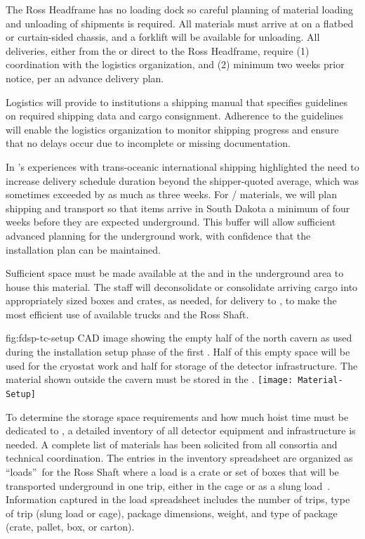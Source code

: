 The Ross Headframe has no loading dock so careful planning of material loading and unloading of shipments is required. 
All materials must arrive at  on a flatbed or curtain-sided chassis, and a forklift will be available for unloading. 
All deliveries, either from the  or direct to the Ross Headframe, require (1) coordination with the logistics organization, and (2) minimum two weeks prior notice, per an advance delivery plan.  
 
Logistics will provide to  institutions a shipping manual that  
specifies guidelines on required shipping data and cargo consignment. Adherence to the guidelines will enable the logistics organization to monitor shipping progress and ensure that no delays occur due to incomplete or missing documentation. 


In 's experiences with trans-oceanic international shipping highlighted the need to increase delivery schedule duration beyond the shipper-quoted average, which was sometimes exceeded by as much as three weeks. For / materials, we will plan shipping and transport so that items arrive in South Dakota a minimum of four weeks before they are expected underground. This buffer will allow sufficient advanced planning for the underground work, with confidence that the installation plan can be maintained.


Sufficient space must be made available at the  and in the underground area  to house this material.
The  staff will deconsolidate or consolidate arriving cargo into appropriately sized boxes and crates, as needed, for delivery to , to make the most efficient use of available trucks and the Ross Shaft. 

\begin{dunefigure}{fig:fdsp-tc-setup}
  {CAD image showing the empty half of the north cavern as used during the installation setup phase of the first .  Half of this empty space will be used for the cryostat work and half for storage of the detector infrastructure. The material shown outside the cavern must be stored in the .}
\texttt{[image: Material-Setup]}
\end{dunefigure}


To determine the storage space requirements and how much hoist time must be dedicated to , a detailed inventory of all   detector equipment and infrastructure is needed. 
A complete list of materials has been solicited from all consortia and technical coordination. 
The entries in the inventory spreadsheet are organized as \textquotedblleft loads\textquotedblright \ for the Ross Shaft where a load is a crate or set of boxes that will be transported underground in one trip, either in the cage or as a slung load~\cite{bib:docdb8426}. 
Information captured in the load spreadsheet includes the number of  
trips, type of trip (slung load or cage), package dimensions, weight, and type of package (crate, pallet, box, or carton). 


